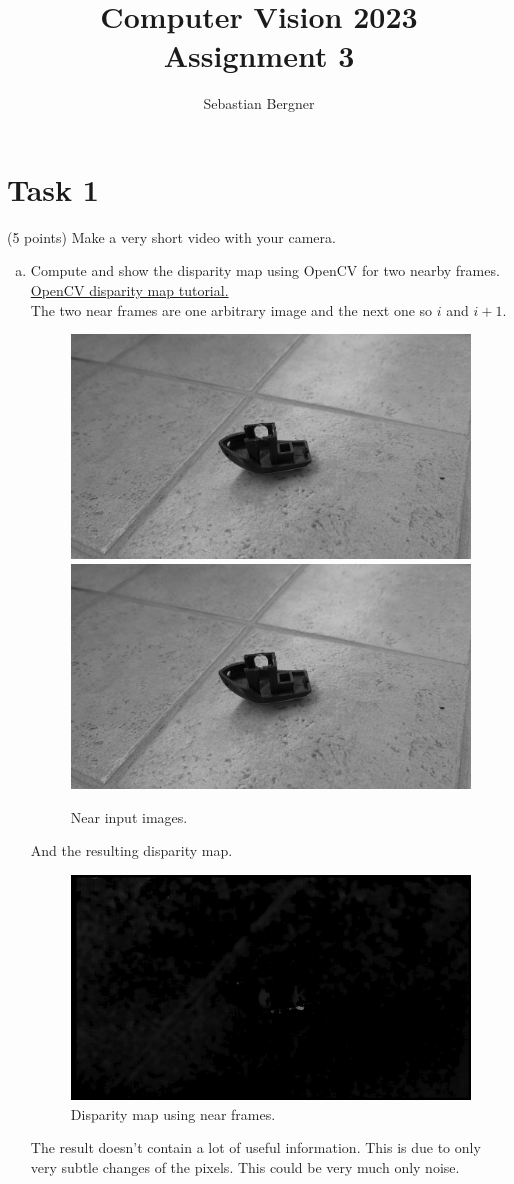 \documentclass[UTF-8]{article}
\title{Computer Vision 2023 \\
	\large Assignment 3} %
\author{Sebastian Bergner}
\begin{document}
	
	\maketitle
	
	\section*{Task 1}
	(5 points) Make a very short video with your camera.
	\begin{enumerate}[a.]
		\item Compute  and  show  the  disparity  map  using  OpenCV  for  two  nearby 
		frames. \href{https://docs.opencv.org/4.x/dd/d53/tutorial_py_depthmap.html}{OpenCV disparity map tutorial.}
		\\The two near frames are one arbitrary image and the next one so $i$ and $i+1$.
		\begin{figure}[H]
			\centering
			\includegraphics[width=0.7\linewidth]{images/exercise1/videooutimg1}
			\includegraphics[width=0.7\linewidth]{images/exercise1/videooutimg2}
			\caption{Near input images.}
			\label{fig:videooutimg1}
		\end{figure}
		And the resulting disparity map.
		\begin{figure}[H]
			\centering
			\includegraphics[width=0.7\linewidth]{images/exercise1/videodisparity_near.png}
			\caption{Disparity map using near frames.}
			\label{fig:disparitynear1}
		\end{figure}
		The result doesn't contain a lot of useful information. This is due to only very subtle changes of the pixels. This could be very much only noise.
		

\end{enumerate}
\end{document}
